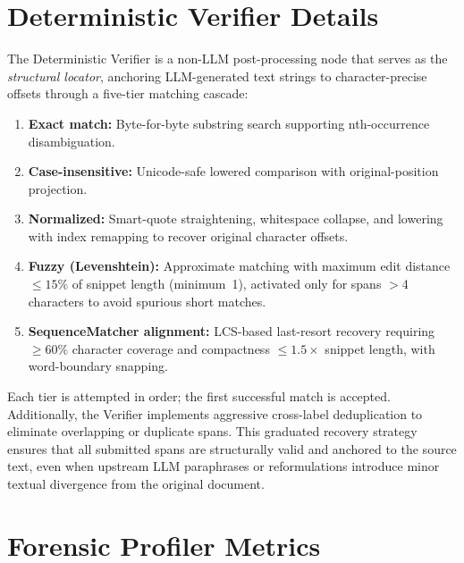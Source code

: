 \documentclass[11pt]{article}
\begin{document}
\section{Deterministic Verifier Details}
\label{app:verifier}
The Deterministic Verifier is a non-LLM post-processing node that serves as
the \textit{structural locator}, anchoring LLM-generated text strings to
character-precise offsets through a five-tier matching cascade:
\begin{enumerate}
	\item[(i)] \textbf{Exact match:} Byte-for-byte substring search supporting nth-occurrence disambiguation.
	\item[(ii)] \textbf{Case-insensitive:} Unicode-safe lowered comparison with original-position projection.
	\item[(iii)] \textbf{Normalized:} Smart-quote straightening, whitespace collapse, and lowering with index remapping to recover original character offsets.
	\item[(iv)] \textbf{Fuzzy (Levenshtein):} Approximate matching with maximum edit distance $\leq 15\%$ of snippet length (minimum~1), activated only for spans $>$4 characters to avoid spurious short matches.
	\item[(v)] \textbf{SequenceMatcher alignment:} LCS-based last-resort recovery requiring $\geq 60\%$ character coverage and compactness $\leq 1.5\times$ snippet length, with word-boundary snapping.
\end{enumerate}
Each tier is attempted in order; the first successful match is accepted.
Additionally, the Verifier implements aggressive cross-label deduplication to
eliminate overlapping or duplicate spans. This graduated recovery strategy
ensures that all submitted spans are structurally valid and anchored to the
source text, even when upstream LLM paraphrases or reformulations introduce
minor textual divergence from the original document.

\section{Forensic Profiler Metrics}
\label{app:forensic}
\end{document}
